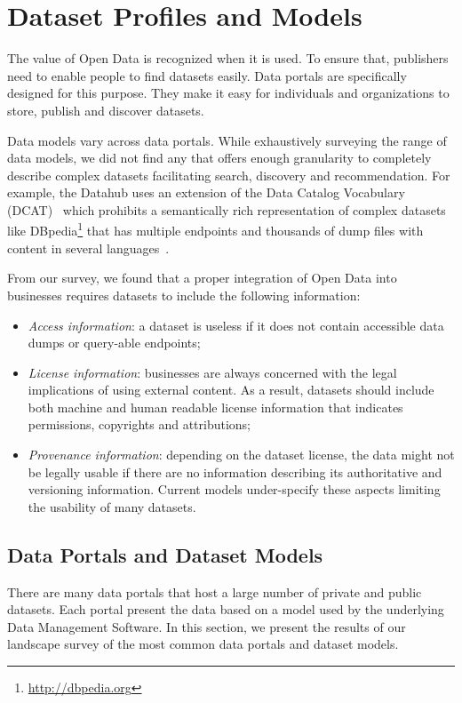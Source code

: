 \chapter{Dataset Profiles and Models}\label{chapter:hdl}
\graphicspath{{part1/chapter1/figures/}}

The value of Open Data is recognized when it is used. To ensure that, publishers need to enable people to find datasets easily. Data portals are specifically designed for this purpose. They make it easy for individuals and organizations to store, publish and discover datasets.

Data models vary across data portals. While exhaustively surveying the range of data models, we did not find any that offers enough granularity to completely describe complex datasets facilitating search, discovery and recommendation. For example, the Datahub uses an extension of the Data Catalog Vocabulary (DCAT)~\cite{Erickson:DCV:14} which prohibits a semantically rich representation of complex datasets like DBpedia\footnote{\url{http://dbpedia.org}} that has multiple endpoints and thousands of dump files with content in several languages~\cite{Brummer::ICSS:14}.

From our survey, we found that a proper integration of Open Data into businesses requires datasets to include the following information:
\begin{itemize}
	\item \emph{Access information}: a dataset is useless if it does not contain accessible data dumps or query-able endpoints;
	\item \emph{License information}: businesses are always concerned with the legal implications of using external content. As a result, datasets should include both machine and human readable license information that indicates permissions, copyrights and attributions;
	\item \emph{Provenance information}: depending on the dataset license, the data might not be legally usable if there are no information describing its authoritative and versioning information. Current models under-specify these aspects limiting the usability of many datasets.
\end{itemize}


\section{Data Portals and Dataset Models}
\label{section:datasetModels}
There are many data portals that host a large number of private and public datasets. Each portal present the data based on a model used by the underlying Data Management Software. In this section, we present the results of our landscape survey of the most common data portals and dataset models.

